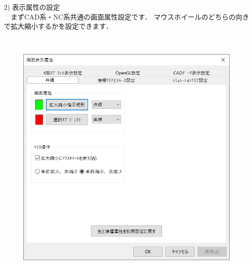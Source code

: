 \begin{minipage}[t]{0.38\textwidth}
2) 表示属性の設定\\
　まずCAD系・NC系共通の画面属性設定です．
マウスホイールのどちらの向きで拡大縮小するかを設定できます．
\end{minipage}
\begin{minipage}[t]{0.02\textwidth}
　
\end{minipage}
\begin{minipage}[t]{0.6\textwidth}
\vspace*{-2zh}
\begin{figure}[H]
\centering
\includegraphics[width=\textwidth]{No6/fig/disp1.png}
\label{fig:disp1.png}
\end{figure}
\end{minipage}

